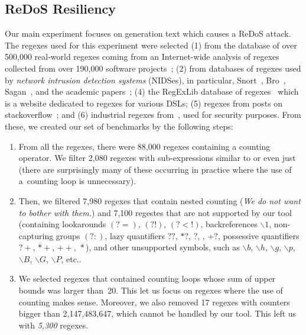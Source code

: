 \documentclass[acmsmall,screen]{acmart}
\begin{document}
\subsection{ReDoS Resiliency}\label{sec:exp_redos}
\vspace{-0.0mm}
Our main experiment focuses on generation text which causes a ReDoS attack.
The regexes used for this experiment were selected (1) from the database of over
500,000 real-world regexes coming
%
from an Internet-wide analysis of regexes collected from over 190,000 software
projects~\cite{DavisMCSL19}; 
(2) from databases of regexes used by \emph{network intrusion detection systems} 
(NIDSes), in particular, Snort~\cite{snort},
Bro~\cite{bro},
Sagan~\cite{sagan}, and the academic
papers~\cite{yang2010,tacas18-appred};
(4) the RegExLib database of regexes~\cite{regexlib} which is a website dedicated to regexes for various DSLs; 
(5) regexes from posts on stackoverflow~\cite{stack}; and
(6) industrial regexes from~\cite{aplas19}, used for security purposes.
From these, we created our set of benchmarks by the following steps:
%
\begin{enumerate}[(1)]
  \item From all the regexes, there were 88,000 regexes containing a counting operator. 
  We filter 2,080 regexes with sub-expressions similar to  or even just 
  (there are surprisingly many of these occurring in practice where the
    use of a~counting loop is unnecessary).
\cbstart
  \item Then, we filtered 7,980 regexes that contain nested counting (\emph{We do not want to bother with them.})
  and 7,100 regestes that are not supported by our tool (containing lookarounds $(?=)$, $(?!)$, $(?<!)$, backreferences $\backslash 1$, non-capturing groups $(?:)$, lazy quantifiers $??$, $*?$, ${}?$, , $+?$, possessive quantifiers $?+$, $*+$, $++$, ${}*$), and other unsupported symbols, such as $\backslash b$, $\backslash h$, $\backslash g$, $\backslash p$, $\backslash B$, $\backslash G$, $\backslash P$, etc..
\cbstart
  \item  We selected regexes that contained counting loops whose
    sum of upper bounds was larger than~20.
    This let us focus on regexes where the use of counting makes
    sense.
    Moreover, we also removed 17 regexes with counters bigger than
    2,147,483,647, which cannot be handled by our tool.
    This left us with \emph{5,300} regexes.
\end{enumerate}
\end{document}
